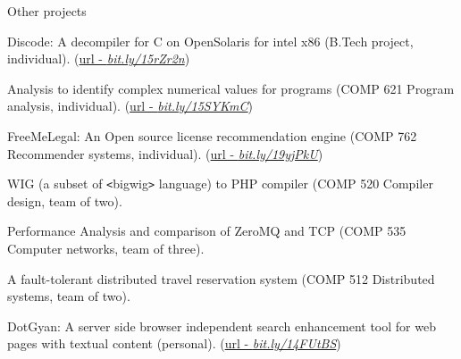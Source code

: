 \documentclass{resume} %
\begin{document}
\begin{rSection}{Other projects}
\smallskip
\begin{lSubsection}
	\item Discode: A decompiler for C on OpenSolaris for intel x86 (B.Tech
project, individual).
			(\href{http://vineetkumar.net/discode/}{url - \em{bit.ly/15rZr2n}})
    \item Analysis to identify complex numerical values for \matlab
programs (COMP 621 Program analysis, individual).
    (\href{https://github.com/Sable/mclab/tree/master/languages/Natlab/src/natlab/tame/valueanalysis/components/isComplex}{url - \em{bit.ly/15SYKmC}}) 
    \item FreeMeLegal: An Open source license recommendation engine (COMP 762
Recommender systems, individual). 
    (\href{http://vineetkumar.net/freeMeLegal/free-me-legal_final_report.pdf}{url - \em{bit.ly/19yjPkU}})
    \item WIG (a subset of \verb+<+bigwig\verb+>+ language) to PHP compiler
(COMP 520 Compiler design, team of two).
    \item Performance Analysis and comparison of ZeroMQ and TCP (COMP 535
Computer networks, team of three).
    \item A fault-tolerant distributed travel reservation system (COMP 512
Distributed systems, team of two). 	
    \item DotGyan: A server side browser independent search enhancement tool for web pages with textual content (personal).
    (\href{http://vineetkumar.net/dotgyan/}{url - \em{bit.ly/14FUtBS}})

\end{lSubsection}
\end{rSection}

\end{document}

